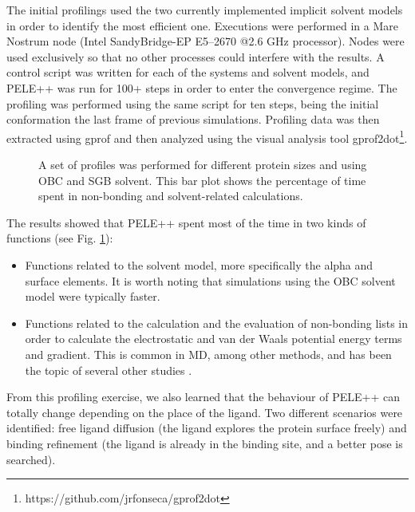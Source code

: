 The initial profilings used the two currently implemented implicit solvent models in order to identify  the
most efficient one. Executions were performed in a Mare Nostrum \cite{barcelona_supercomputing_center_marenostrum_2015} node (Intel
SandyBridge-EP E5--2670 @2.6 GHz processor). Nodes were used exclusively so that no other
processes could interfere with the results. A control script was written for each of the systems and solvent models, and
PELE++ was run for 100+ steps in order to enter the convergence regime. The profiling was performed using the same
script for ten steps, being the initial conformation the last frame of previous simulations. Profiling data was then
extracted using gprof \cite{graham_gprof_1982} and then analyzed using the visual analysis tool
gprof2dot\footnote{https://github.com/jrfonseca/gprof2dot}. 

\begin{figure}


\caption{A set of profiles was performed for different protein sizes and using OBC and SGB solvent. This bar plot shows the percentage of time spent in non-bonding and solvent-related calculations.}

\label{fig:first_profile}

\end{figure}

The results showed that PELE++ spent most of the time in two kinds of functions (see Fig.
\ref{fig:first_profile}):

\begin{itemize}
\item Functions related to the solvent model, more specifically the alpha and surface elements. It is worth noting
that simulations using the OBC solvent model were typically faster. 
\item Functions related to the calculation and the evaluation of non-bonding lists in order to calculate the
electrostatic and van der Waals potential energy terms and gradient. This is common in MD, among other methods, and has been
the topic of several other studies \cite{myung_accelerating_2010, schmid_gpu_2010, jin_cuda_2011}. 
\end{itemize}
From this profiling exercise, we also learned that the behaviour of PELE++ can totally change depending on the place of
the ligand. Two different scenarios were identified: free ligand diffusion (the ligand explores the protein surface freely) and binding refinement (the ligand is already in the binding site, and a better pose is searched).

